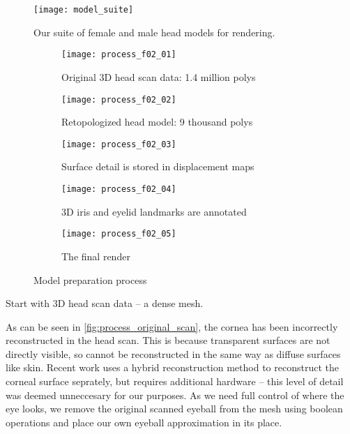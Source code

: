 \begin{figure*}
    \texttt{[image: model\_suite]}
    \caption{Our suite of female and male head models for rendering.}
    \label{fig:model_suite}
\end{figure*}

\begin{figure*}
    \centering
    \begin{subfigure}[t]{0.195\textwidth}
        \texttt{[image: process\_f02\_01]}
        \caption{Original 3D head scan data: 1.4 million polys}
        \label{fig:process_original_scan}
    \end{subfigure}
    \hfill
    \begin{subfigure}[t]{0.195\textwidth}
        \texttt{[image: process\_f02\_02]}
        \caption{Retopologized head model: 9 thousand polys}
        \label{fig:process_retopo}
    \end{subfigure}
    \hfill
    \begin{subfigure}[t]{0.195\textwidth}
        \texttt{[image: process\_f02\_03]}
        \caption{Surface detail is stored in displacement maps}
    \end{subfigure}
    \hfill
    \begin{subfigure}[t]{0.195\textwidth}
        \texttt{[image: process\_f02\_04]}
        \caption{3D iris and eyelid landmarks are annotated}
    \end{subfigure}
    \hfill
    \begin{subfigure}[t]{0.195\textwidth}
        \texttt{[image: process\_f02\_05]}
        \caption{The final render}
    \end{subfigure}
    \caption{Model preparation process}
    \label{fig:process}
\end{figure*}

Start with 3D head scan data -- a dense mesh.

As can be seen in \autoref{fig:process_original_scan}, the cornea has been incorrectly reconstructed in the head scan. This is because transparent surfaces are not directly visible, so cannot be reconstructed in the same way as diffuse surfaces like skin. Recent work uses a hybrid reconstruction method to reconstruct the corneal surface seprately, but requires additional hardware \cite{berard2014highquality} -- this level of detail was deemed unneccesary for our purposes. As we need full control of where the eye looks, we remove the original scanned eyeball from the mesh using boolean operations and place our own eyeball approximation in its place.

